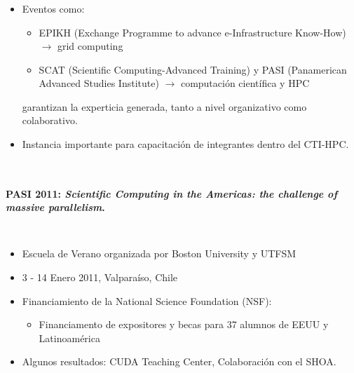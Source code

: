 \frame
{
\frametitle{}


\begin{columns}
\begin{itemize}
\item Eventos como:
\begin{itemize} 
\item  EPIKH (Exchange Programme to advance e-Infrastructure Know-How) $\rightarrow$ grid computing
\item SCAT (Scientific Computing-Advanced Training) y PASI (Panamerican Advanced Studies Institute) $\rightarrow$ computaci\'{o}n cient\'{i}fica y HPC
\end{itemize} 
garantizan 
la experticia generada, tanto a nivel organizativo como colaborativo. 
\item Instancia importante para capacitación de integrantes dentro del CTI-HPC. 
\end{itemize}
\end{columns}
}


\frame
{
\frametitle{}
\framesubtitle{PASI 2011: \emph{Scientific Computing in the Americas: the challenge of massive parallelism}.}

\begin{columns}
\begin{itemize}
\item  Escuela de Verano organizada por Boston University y  UTFSM
\item 3 - 14 Enero  2011, Valpara\'{i}so, Chile
\item Financiamiento de la National Science Foundation (NSF):
        \begin{itemize}
        \item Financiamento de expositores y becas para 37 alumnos de EEUU y
Latinoamérica
        \end{itemize}
\item Algunos resultados: CUDA Teaching Center, Colaboración con el SHOA.
\end{itemize}
\end{columns}

}




